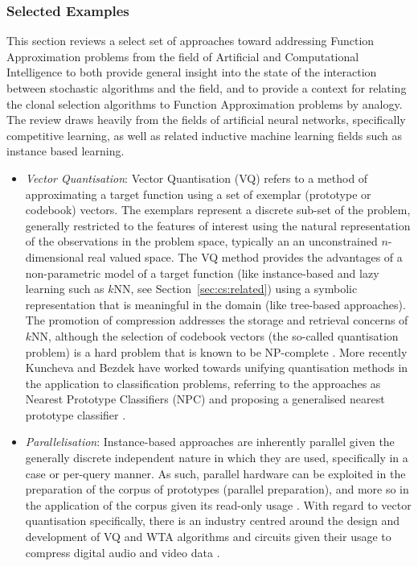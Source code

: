 %
%
\subsubsection{Selected Examples}
This section reviews a select set of approaches toward addressing Function Approximation problems from the field of Artificial and Computational Intelligence to both provide general insight into the state of the interaction between stochastic algorithms and the field, and to provide a context for relating the clonal selection algorithms to Function Approximation problems by analogy. The review draws heavily from the fields of artificial neural networks, specifically competitive learning, as well as related inductive machine learning fields such as instance based learning.

\begin{itemize}
	\item \emph{Vector Quantisation}: Vector Quantisation (VQ) refers to a method of approximating a target function using a set of exemplar (prototype or codebook) vectors. The exemplars represent a discrete sub-set of the problem, generally restricted to the features of interest using the natural representation of the observations in the problem space, typically an an unconstrained $n$-dimensional real valued space. The VQ method provides the advantages of a non-parametric model of a target function (like instance-based and lazy learning such as $k$NN, see Section~\ref{sec:cs:related}) using a symbolic representation that is meaningful in the domain (like tree-based approaches). The promotion of compression addresses the storage and retrieval concerns of $k$NN, although the selection of codebook vectors (the so-called quantisation problem) is a hard problem that is known to be NP-complete \cite{Garey1982}. More recently Kuncheva and Bezdek have worked towards unifying quantisation methods in the application to classification problems, referring to the approaches as Nearest Prototype Classifiers (NPC) and proposing a generalised nearest prototype classifier \cite{Kuncheva1998, Kuncheva1998a}.
	
	\item \emph{Parallelisation}: Instance-based approaches are inherently parallel given the generally discrete independent nature in which they are used, specifically in a case or per-query manner. As such, parallel hardware can be exploited in the preparation of the corpus of prototypes (parallel preparation), and more so in the application of the corpus given its read-only usage \cite{Aamodt1994, Nagendra1996, Plaza1997}. With regard to vector quantisation specifically, there is an industry centred around the design and development of VQ and WTA algorithms and circuits given their usage to compress digital audio and video data \cite{Nakada1999, Parhi1994}.
	

\end{itemize}
